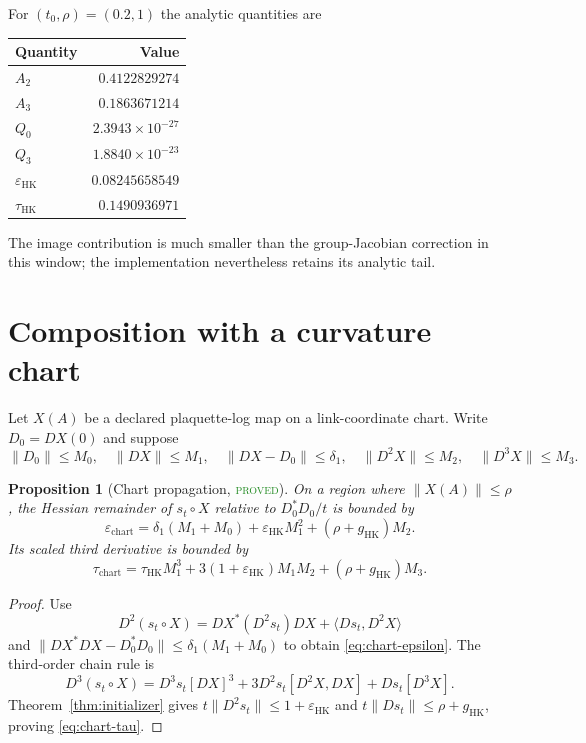 \documentclass[11pt]{article}
\newtheorem{proposition}[theorem]{Proposition}
\theoremstyle{definition}
\newcommand{\statusproved}{\textcolor{ForestGreen}{\textsc{proved}}}
\begin{document}
For $(t_0,\rho)=(0.2,1)$ the analytic quantities are
\begin{center}
\begin{tabular}{@{}lr@{}}
\toprule
Quantity & Value\\
\midrule
$A_2$ & $0.4122829274$\\
$A_3$ & $0.1863671214$\\
$Q_0$ & $2.3943\times10^{-27}$\\
$Q_3$ & $1.8840\times10^{-23}$\\
$\varepsilon_{\mathrm{HK}}$ & $0.08245658549$\\
$\tau_{\mathrm{HK}}$ & $0.1490936971$\\
\bottomrule
\end{tabular}
\end{center}
The image contribution is much smaller than the group-Jacobian correction in
this window; the implementation nevertheless retains its analytic tail.

\section{Composition with a curvature chart}

Let $X(A)$ be a declared plaquette-log map on a link-coordinate chart.  Write
$D_0=DX(0)$ and suppose
\begin{equation}\label{eq:chart-norms}
 \|D_0\|\le M_0,\quad \|DX\|\le M_1,\quad
 \|DX-D_0\|\le\delta_1,\quad
 \|D^2X\|\le M_2,\quad \|D^3X\|\le M_3.
\end{equation}

\begin{proposition}[Chart propagation, \statusproved]\label{prop:chart}
On a region where $\|X(A)\|\le\rho$, the Hessian remainder of
$s_t\circ X$ relative to $D_0^*D_0/t$ is bounded by
\begin{equation}\label{eq:chart-epsilon}
 \varepsilon_{\mathrm{chart}}
 =\delta_1(M_1+M_0)
 +\varepsilon_{\mathrm{HK}}M_1^2
 +(\rho+g_{\mathrm{HK}})M_2.
\end{equation}
Its scaled third derivative is bounded by
\begin{equation}\label{eq:chart-tau}
 \tau_{\mathrm{chart}}
 =\tau_{\mathrm{HK}}M_1^3
 +3(1+\varepsilon_{\mathrm{HK}})M_1M_2
 +(\rho+g_{\mathrm{HK}})M_3.
\end{equation}
\end{proposition}
\begin{proof}
Use
\[
 D^2(s_t\circ X)=DX^*(D^2s_t)DX+\langle Ds_t,D^2X\rangle
\]
and
$\|DX^*DX-D_0^*D_0\|\le\delta_1(M_1+M_0)$ to obtain
\eqref{eq:chart-epsilon}.  The third-order chain rule is
\[
 D^3(s_t\circ X)=D^3s_t[DX]^3
 +3D^2s_t[D^2X,DX]+Ds_t[D^3X].
\]
Theorem~\ref{thm:initializer} gives
$t\|D^2s_t\|\le1+\varepsilon_{\mathrm{HK}}$ and
$t\|Ds_t\|\le\rho+g_{\mathrm{HK}}$, proving
\eqref{eq:chart-tau}.
\end{proof}
\end{document}
